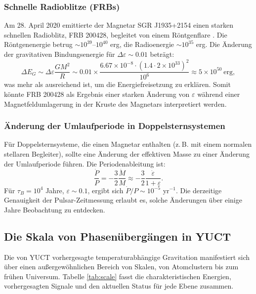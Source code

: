 \documentclass[12pt]{article}
\theoremstyle{remark}
\newcommand{\eps}{\varepsilon}
\begin{document}
	\subsubsection{Schnelle Radioblitze (FRBs)}\label{subsec:magnetars-frb}
	
	Am 28. April 2020 emittierte der Magnetar SGR J1935+2154 einen starken schnellen Radioblitz, FRB 200428, begleitet von einem Röntgenflare \cite{Geng2020}. Die Röntgenenergie betrug $\sim 10^{39}$–$10^{40}$ erg, die Radioenergie $\sim 10^{35}$ erg. Die Änderung der gravitativen Bindungsenergie für $\Delta\eps \sim 0.01$ beträgt:
	\begin{equation}
		\Delta E_G \sim \Delta\eps \frac{GM^2}{R} \sim 0.01 \times \frac{6.67\times10^{-8} \cdot (1.4\cdot 2\times10^{33})^2}{10^6} \approx 5\times10^{50}\ \text{erg},
	\end{equation}
	was mehr als ausreichend ist, um die Energiefreisetzung zu erklären. Somit könnte FRB 200428 als Ergebnis einer starken Änderung von $\eps$ während einer Magnetfeldumlagerung in der Kruste des Magnetars interpretiert werden.
	
	\subsubsection{Änderung der Umlaufperiode in Doppelsternsystemen}
	\label{subsubsec:magnetars-binary}
	
	Für Doppelsternsysteme, die einen Magnetar enthalten (z. B. mit einem normalen stellaren Begleiter), sollte eine Änderung der effektiven Masse zu einer Änderung der Umlaufperiode führen. Die Periodenableitung ist:
	\begin{equation}
		\frac{\dot{P}}{P} = -\frac{3}{2} \frac{\dot{M}}{M} \approx -\frac{3}{2} \frac{\dot{\eps}}{1+\eps}.
		\label{eq:pdot}
	\end{equation}
	Für $\tau_B = 10^4$ Jahre, $\eps \sim 0.1$, ergibt sich $\dot{P}/P \sim 10^{-5}$ yr$^{-1}$. Die derzeitige Genauigkeit der Pulsar-Zeitmessung erlaubt es, solche Änderungen über einige Jahre Beobachtung zu entdecken.
	
	\subsection{Die Skala von Phasenübergängen in YUCT}
	\label{subsec:scale}
	
	Die von YUCT vorhergesagte temperaturabhängige Gravitation manifestiert sich über einen außergewöhnlichen Bereich von Skalen, von Atomclustern bis zum frühen Universum. Tabelle \ref{tab:scale} fasst die charakteristischen Energien, vorhergesagten Signale und den aktuellen Status für jede Ebene zusammen.
	
\end{document}
